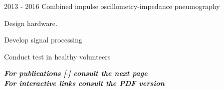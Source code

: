 \documentclass[letterpaper]{twentysecondcv} %
\begin{document}
\begin{RigthPage1}
\begin{twenty}
  
  \twentyitemlist
    	{2013 - 2016}
        {Combined impulse oscillometry-impedance pneumography~\cite{iosj,multi}}
        {}
        {
        \item Design hardware. 
        \item Develop signal processing
        \item Conduct test in healthy volunteers
        }       
\end{twenty} 
\begin{flushright}
\textbf{\textit{For publications [$\cdot$] consult the next page}}
\\
\textbf{\textit{For interactive links consult the PDF version}}
\end{flushright}
\end{RigthPage1}


\newpage
\end{document}
